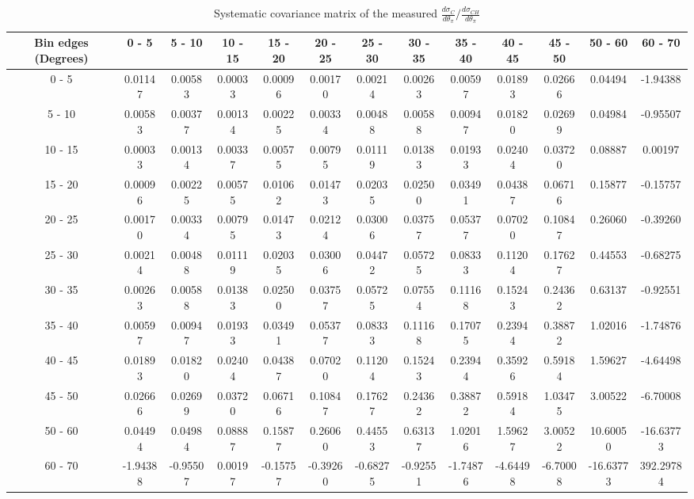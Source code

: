 \documentclass[aps,prl,twocolumn,superscriptaddress,nofootinbib]{revtex4-1}
\begin{document}
\begin{turnpage}
 \begin{table}[h!]
  \centering
  \caption{Systematic covariance matrix of the measured $\frac{d\sigma_{C}}{d\theta_{\pi}}/\frac{d\sigma_{CH}}{d\theta_{\pi}}$}
    \begin{tabular}{c||cccccccccccc}
      Bin edges (Degrees) & 0 - 5 & 5 - 10 & 10 - 15 & 15 - 20 & 20 - 25 & 25 - 30 & 30 - 35 & 35 - 40 & 40 - 45 & 45 - 50 & 50 - 60 & 60 - 70 \\
\hline \hline
        0 - 5 &  0.01147 &  0.00583 &  0.00033 &  0.00096 &  0.00170 &  0.00214 &  0.00263 &  0.00597 &  0.01893 &  0.02666 &  0.04494 & -1.94388 \\
       5 - 10 &  0.00583 &  0.00377 &  0.00134 &  0.00225 &  0.00334 &  0.00488 &  0.00588 &  0.00947 &  0.01820 &  0.02699 &  0.04984 & -0.95507 \\
      10 - 15 &  0.00033 &  0.00134 &  0.00337 &  0.00575 &  0.00795 &  0.01119 &  0.01383 &  0.01933 &  0.02404 &  0.03720 &  0.08887 &  0.00197 \\
      15 - 20 &  0.00096 &  0.00225 &  0.00575 &  0.01062 &  0.01473 &  0.02035 &  0.02500 &  0.03491 &  0.04387 &  0.06716 &  0.15877 & -0.15757 \\
      20 - 25 &  0.00170 &  0.00334 &  0.00795 &  0.01473 &  0.02124 &  0.03006 &  0.03757 &  0.05377 &  0.07020 &  0.10847 &  0.26060 & -0.39260 \\
      25 - 30 &  0.00214 &  0.00488 &  0.01119 &  0.02035 &  0.03006 &  0.04472 &  0.05725 &  0.08333 &  0.11204 &  0.17627 &  0.44553 & -0.68275 \\
      30 - 35 &  0.00263 &  0.00588 &  0.01383 &  0.02500 &  0.03757 &  0.05725 &  0.07554 &  0.11168 &  0.15243 &  0.24362 &  0.63137 & -0.92551 \\
      35 - 40 &  0.00597 &  0.00947 &  0.01933 &  0.03491 &  0.05377 &  0.08333 &  0.11168 &  0.17075 &  0.23944 &  0.38872 &  1.02016 & -1.74876 \\
      40 - 45 &  0.01893 &  0.01820 &  0.02404 &  0.04387 &  0.07020 &  0.11204 &  0.15243 &  0.23944 &  0.35926 &  0.59184 &  1.59627 & -4.64498 \\
      45 - 50 &  0.02666 &  0.02699 &  0.03720 &  0.06716 &  0.10847 &  0.17627 &  0.24362 &  0.38872 &  0.59184 &  1.03475 &  3.00522 & -6.70008 \\
      50 - 60 &  0.04494 &  0.04984 &  0.08887 &  0.15877 &  0.26060 &  0.44553 &  0.63137 &  1.02016 &  1.59627 &  3.00522 & 10.60050 & -16.63773 \\
      60 - 70 & -1.94388 & -0.95507 &  0.00197 & -0.15757 & -0.39260 & -0.68275 & -0.92551 & -1.74876 & -4.64498 & -6.70008 & -16.63773 & 392.29784 \\
    \end{tabular}
  \label{tablecov:C_Systematic_ThetaPi}
  \end{table}
\end{turnpage}
\end{document}
